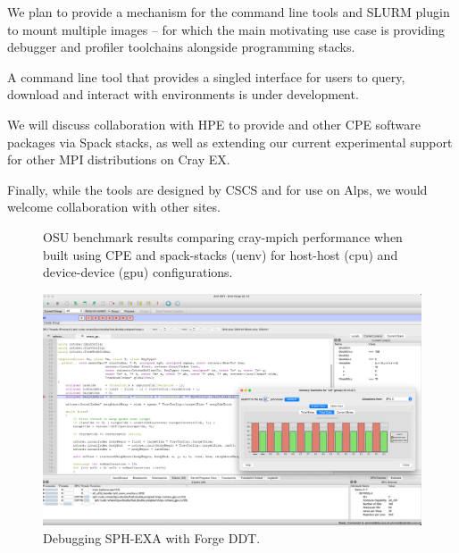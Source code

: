 We plan to provide a mechanism for the command line tools and SLURM plugin to mount multiple images -- for which the main motivating use case is providing debugger and profiler toolchains alongside programming stacks.

A command line tool that provides a singled interface for users to query, download and interact with environments is under development.

We will discuss collaboration with HPE to provide \craympich and other CPE software packages via Spack stacks, as well as extending our current experimental support for other MPI distributions on Cray EX.

Finally, while the tools are designed by CSCS and for use on Alps, we would welcome collaboration with other sites.

\vfill\eject

%        

\begin{figure}[htp!]
    \begin{center}
        
        \hfill
        \newline
        
        \hfill
        \newline
        
        \hfill
        \newline
    \end{center}
    \caption{OSU benchmark results comparing cray-mpich performance when built using CPE and spack-stacks (uenv) for host-host (cpu) and device-device (gpu) configurations.}
    \label{fig:osu}
\end{figure}

\vfill\eject
\begin{figure}[htp!]
    \begin{center}
        \includegraphics[width=\textwidth]{./images/sph-ddt-uenv.png}
    \end{center}
    \caption{Debugging SPH-EXA with Forge DDT.}
    \label{fig:sph-ddt-uenv}
\end{figure}

